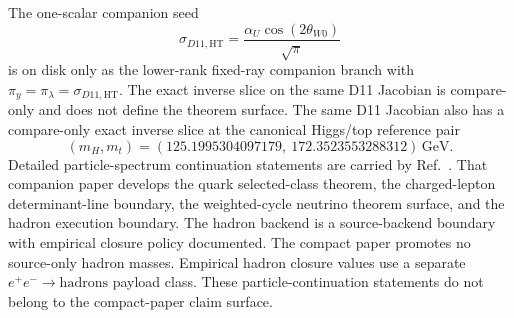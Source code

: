 \documentclass[11pt]{article}
\begin{document}
The one-scalar companion seed
\[
\sigma_{D11,\mathrm{HT}}=\frac{\alpha_U\cos(2\theta_{W0})}{\sqrt{\pi}}
\]
is on disk only as the lower-rank fixed-ray companion branch with \(\pi_y=\pi_\lambda=\sigma_{D11,\mathrm{HT}}\). The exact inverse slice on the same D11 Jacobian is compare-only and does not define the theorem surface.
The same D11 Jacobian also has a compare-only exact inverse slice at the canonical Higgs/top reference pair
\[
(m_H,m_t)=
(125.1995304097179,\ 172.3523553288312)\,\mathrm{GeV}.
\]
Detailed particle-spectrum continuation statements are carried by Ref.~\cite{ophparticles}. That companion paper develops the quark selected-class theorem, the charged-lepton determinant-line boundary, the weighted-cycle neutrino theorem surface, and the hadron execution boundary. The hadron backend is a source-backend boundary with empirical closure policy documented. The compact paper promotes no source-only hadron masses. Empirical hadron closure values use a separate \(e^+e^-\to\mathrm{hadrons}\) payload class. These particle-continuation statements do not belong to the compact-paper claim surface.
\end{document}
